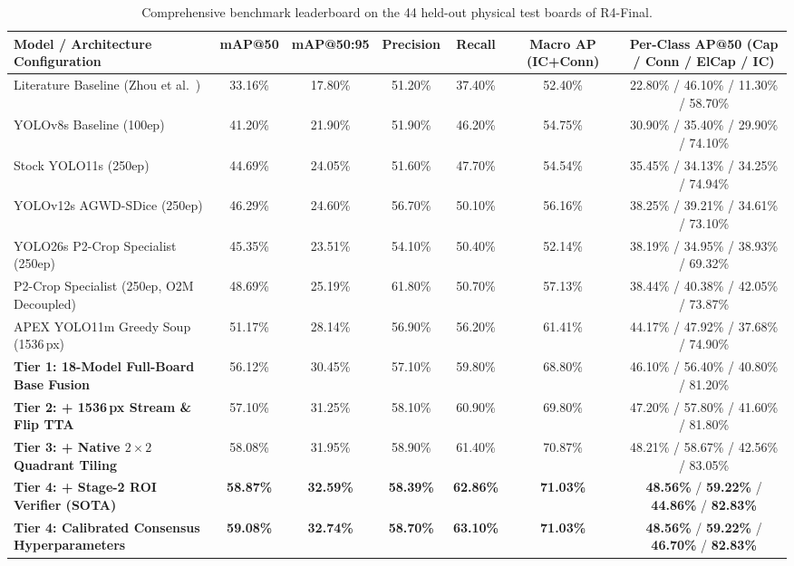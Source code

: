 \begin{table}[!t]
\centering
\caption{Comprehensive benchmark leaderboard on the 44 held-out physical test boards of R4-Final.}
\label{tab:leaderboard}
\small\setlength{\tabcolsep}{4.5pt}
\begin{tabular}{lcccccc}
\toprule
Model / Architecture Configuration & mAP@50 & mAP@50:95 & Precision & Recall & Macro AP (IC+Conn) & Per-Class AP@50 (Cap / Conn / ElCap / IC) \\
\midrule
Literature Baseline (Zhou et al.~\cite{zhou2026information}) & 33.16\% & 17.80\% & 51.20\% & 37.40\% & 52.40\% & 22.80\% / 46.10\% / 11.30\% / 58.70\% \\
YOLOv8s Baseline (100ep)                          & 41.20\% & 21.90\% & 51.90\% & 46.20\% & 54.75\% & 30.90\% / 35.40\% / 29.90\% / 74.10\% \\
Stock YOLO11s (250ep)                             & 44.69\% & 24.05\% & 51.60\% & 47.70\% & 54.54\% & 35.45\% / 34.13\% / 34.25\% / 74.94\% \\
YOLOv12s AGWD-SDice (250ep)                       & 46.29\% & 24.60\% & 56.70\% & 50.10\% & 56.16\% & 38.25\% / 39.21\% / 34.61\% / 73.10\% \\
YOLO26s P2-Crop Specialist (250ep)                & 45.35\% & 23.51\% & 54.10\% & 50.40\% & 52.14\% & 38.19\% / 34.95\% / 38.93\% / 69.32\% \\
P2-Crop Specialist (250ep, O2M Decoupled)         & 48.69\% & 25.19\% & 61.80\% & 50.70\% & 57.13\% & 38.44\% / 40.38\% / 42.05\% / 73.87\% \\
APEX YOLO11m Greedy Soup (1536\,px)               & 51.17\% & 28.14\% & 56.90\% & 56.20\% & 61.41\% & 44.17\% / 47.92\% / 37.68\% / 74.90\% \\
\midrule
\textbf{Tier 1: 18-Model Full-Board Base Fusion}  & 56.12\% & 30.45\% & 57.10\% & 59.80\% & 68.80\% & 46.10\% / 56.40\% / 40.80\% / 81.20\% \\
\textbf{Tier 2: + 1536\,px Stream \& Flip TTA}    & 57.10\% & 31.25\% & 58.10\% & 60.90\% & 69.80\% & 47.20\% / 57.80\% / 41.60\% / 81.80\% \\
\textbf{Tier 3: + Native $2\times 2$ Quadrant Tiling}& 58.08\% & 31.95\% & 58.90\% & 61.40\% & 70.87\% & 48.21\% / 58.67\% / 42.56\% / 83.05\% \\
\textbf{Tier 4: + Stage-2 ROI Verifier (SOTA)}    & \textbf{58.87\%} & \textbf{32.59\%} & \textbf{58.39\%} & \textbf{62.86\%} & \textbf{71.03\%} & \textbf{48.56\%} / \textbf{59.22\%} / \textbf{44.86\%} / \textbf{82.83\%} \\
\textbf{Tier 4: Calibrated Consensus Hyperparameters} & \textbf{59.08\%} & \textbf{32.74\%} & \textbf{58.70\%} & \textbf{63.10\%} & \textbf{71.03\%} & \textbf{48.56\%} / \textbf{59.22\%} / \textbf{46.70\%} / \textbf{82.83\%} \\
\bottomrule
\end{tabular}
\end{table}

